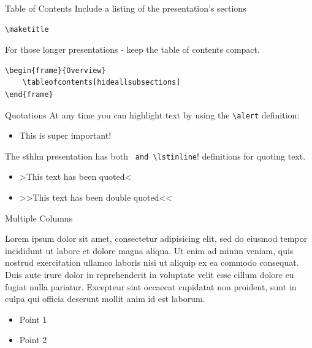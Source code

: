 \documentclass[compress]{beamer}
\begin{document}
\begin{frame}[containsverbatim]{Table of Contents}
Include a listing of the presentation's sections 
\begin{lstlisting}
\maketitle
\end{lstlisting}
For those longer presentations - keep the table of contents compact.
\begin{lstlisting}
\begin{frame}{Overview}
	\tableofcontents[hideallsubsections]
\end{frame}
\end{lstlisting}
\end{frame}


\begin{frame}[containsverbatim]{Quotations}
At any time you can highlight text by using the \lstinline!\alert! definition:
\begin{itemize}
	\item \alert{This is super important!}
\end{itemize}
The sthlm presentation has both \lstinline! and \lstinline!! definitions for quoting text.
\begin{itemize}
	\item[] >This text has been quoted<
	\item[] >>This text has been double quoted<<
\end{itemize}
\end{frame}



\begin{frame}{Multiple Columns}
	\begin{multicols}{2}
		Lorem ipsum dolor sit amet, consectetur adipisicing elit, sed do eiusmod
		tempor incididunt ut labore et dolore magna aliqua. Ut enim ad minim veniam,
		quis nostrud exercitation ullamco laboris nisi ut aliquip ex ea commodo
		consequat. Duis aute irure dolor in reprehenderit in voluptate velit esse
		cillum dolore eu fugiat nulla pariatur. Excepteur sint occaecat cupidatat non
		proident, sunt in culpa qui officia deserunt mollit anim id est laborum.
		\begin{itemize}
        	\item Point 1
        	\item Point 2
		\end{itemize}
	\end{multicols}
\end{frame}
\end{document}
